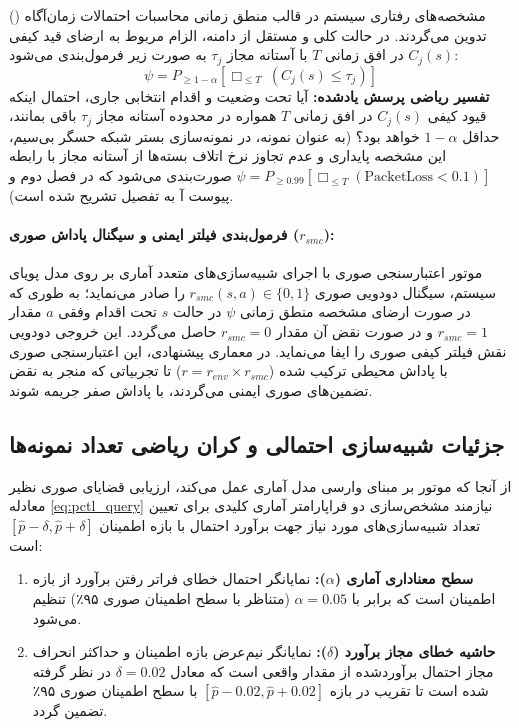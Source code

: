 \documentclass[oneside,openany,phd]{TMU-Thesis}
\begin{document}
مشخصه‌های رفتاری سیستم در قالب منطق زمانی محاسبات احتمالات زمان‌آگاه () \cite{hansson1994logic} تدوین می‌گردند. در حالت کلی و مستقل از دامنه، الزام مربوط به ارضای قید کیفی $C_j(s)$ در افق زمانی $T$ با آستانه مجاز $\tau_j$ به صورت زیر فرمول‌بندی می‌شود:
\begin{equation}
\psi = P_{\geq 1-\alpha} \left[ \Box_{\leq T} \ (C_j(s) \le \tau_j) \right]
\label{eq:pctl_query}
\end{equation}
\textbf{تفسیر ریاضی پرسش یادشده:} آیا تحت وضعیت و اقدام انتخابی جاری، احتمال اینکه قیود کیفی $C_j(s)$ در افق زمانی $T$ همواره در محدوده آستانه مجاز $\tau_j$ باقی بمانند، حداقل $1-\alpha$ خواهد بود؟ (به عنوان نمونه، در نمونه‌سازی بستر شبکه حسگر بی‌سیم، این مشخصه پایداری و عدم تجاوز نرخ اتلاف بسته‌ها از آستانه مجاز با رابطه $\psi = P_{\ge 0.99}[\Box_{\le T} (\text{PacketLoss} < 0.1)]$ صورت‌بندی می‌شود که در فصل دوم و پیوست آ به تفصیل تشریح شده است).

\paragraph{فرمول‌بندی فیلتر ایمنی و سیگنال پاداش صوری ($r_{smc}$):}
موتور اعتبارسنجی صوری با اجرای شبیه‌سازی‌های متعدد آماری بر روی مدل پویای سیستم، سیگنال دودویی صوری $r_{smc}(s, a) \in \{0, 1\}$ را صادر می‌نماید؛ به طوری که در صورت ارضای مشخصه منطق زمانی $\psi$ در حالت $s$ تحت اقدام وفقی $a$ مقدار $r_{smc} = 1$ و در صورت نقض آن مقدار $r_{smc} = 0$ حاصل می‌گردد. این خروجی دودویی نقش فیلتر کیفی صوری را ایفا می‌نماید. در معماری پیشنهادی، این اعتبارسنجی صوری با پاداش محیطی ترکیب شده ($r = r_{env} \times r_{smc}$) تا تجربیاتی که منجر به نقض تضمین‌های صوری ایمنی می‌گردند، با پاداش صفر جریمه شوند.

\subsection{جزئیات شبیه‌سازی احتمالی و کران ریاضی تعداد نمونه‌ها}
\label{subsec:smc_probabilistic_parameters}
از آنجا که موتور  بر مبنای وارسی مدل آماری عمل می‌کند، ارزیابی قضایای صوری نظیر معادله \ref{eq:pctl_query} نیازمند مشخص‌سازی دو فراپارامتر آماری کلیدی برای تعیین تعداد شبیه‌سازی‌های مورد نیاز جهت برآورد احتمال با بازه اطمینان $[\hat{p} - \delta, \hat{p} + \delta]$ است:
\begin{enumerate}
    \item \textbf{سطح معناداری آماری ($\alpha$):} نمایانگر احتمال خطای فراتر رفتن برآورد از بازه اطمینان است که برابر با $\alpha = 0.05$ (متناظر با سطح اطمینان صوری ۹۵٪) تنظیم می‌شود.
    \item \textbf{حاشیه خطای مجاز برآورد ($\delta$):} نمایانگر نیم‌عرض بازه اطمینان و حداکثر انحراف مجاز احتمال برآوردشده از مقدار واقعی است که معادل $\delta = 0.02$ در نظر گرفته شده است تا تقریب در بازه $[\hat{p} - 0.02, \hat{p} + 0.02]$ با سطح اطمینان صوری ۹۵٪ تضمین گردد.
\end{enumerate}
\end{document}
